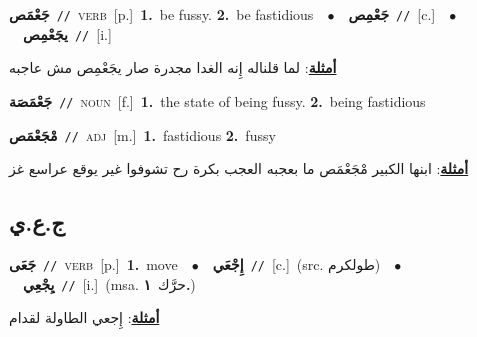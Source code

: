 \documentclass[10pt,a4paper,twoside]{article} %
\begin{document}
\begin{multicols}{2}
{\setlength\topsep{0pt}\textbf{\foreignlanguage{arabic}{جَعْمَص}}\ {\color{gray}\texttt{//}\color{black}}\ \textsc{verb}\ [p.]\ \textbf{1.}~be fussy.  \textbf{2.}~be fastidious\ \ $\bullet$\ \ \setlength\topsep{0pt}\textbf{\foreignlanguage{arabic}{جَعْمِص}}\ {\color{gray}\texttt{//}\color{black}}\ [c.]\ \ $\bullet$\ \ \setlength\topsep{0pt}\textbf{\foreignlanguage{arabic}{يجَعْمِص}}\ {\color{gray}\texttt{//}\color{black}}\ [i.]\  \begin{flushright}\color{gray}\foreignlanguage{arabic}{\textbf{\underline{\foreignlanguage{arabic}{أمثلة}}}: لما قلناله إِنه الغدا مجدرة صار يجَعْمِص مش عاجبه}\end{flushright}\color{black}} \vspace{2mm}

{\setlength\topsep{0pt}\textbf{\foreignlanguage{arabic}{جَعْمَصَة}}\ {\color{gray}\texttt{//}\color{black}}\ \textsc{noun}\ [f.]\ \textbf{1.}~the state of being  fussy.  \textbf{2.}~being fastidious\ } \vspace{2mm}

{\setlength\topsep{0pt}\textbf{\foreignlanguage{arabic}{مْجَعْمَص}}\ {\color{gray}\texttt{//}\color{black}}\ \textsc{adj}\ [m.]\ \textbf{1.}~fastidious  \textbf{2.}~fussy\  \begin{flushright}\color{gray}\foreignlanguage{arabic}{\textbf{\underline{\foreignlanguage{arabic}{أمثلة}}}: ابنها الكبير مْجَعْمَص ما بعجبه العجب بكرة رح تشوفوا غير يوقع عراسع غز}\end{flushright}\color{black}} \vspace{2mm}

\vspace{-3mm}
\subsection*{\color{blue}\foreignlanguage{arabic}{ج.ع.ي}\color{blue}{}} 

{\setlength\topsep{0pt}\textbf{\foreignlanguage{arabic}{جَعَى}}\ {\color{gray}\texttt{//}\color{black}}\ \textsc{verb}\ [p.]\ \textbf{1.}~move\ \ $\bullet$\ \ \setlength\topsep{0pt}\textbf{\foreignlanguage{arabic}{إِجْعَي}}\ {\color{gray}\texttt{//}\color{black}}\ [c.]\ (src. \color{gray}\foreignlanguage{arabic}{طولكرم}\color{black})\ \ $\bullet$\ \ \setlength\topsep{0pt}\textbf{\foreignlanguage{arabic}{يِجْعِي}}\ {\color{gray}\texttt{//}\color{black}}\ [i.]\ \color{gray}(msa. \foreignlanguage{arabic}{حرَّك}~\foreignlanguage{arabic}{\textbf{١.}})\color{black}\  \begin{flushright}\color{gray}\foreignlanguage{arabic}{\textbf{\underline{\foreignlanguage{arabic}{أمثلة}}}: إِجعي الطاولة لقدام}\end{flushright}\color{black}} \vspace{2mm}


\end{multicols}
\end{document}
